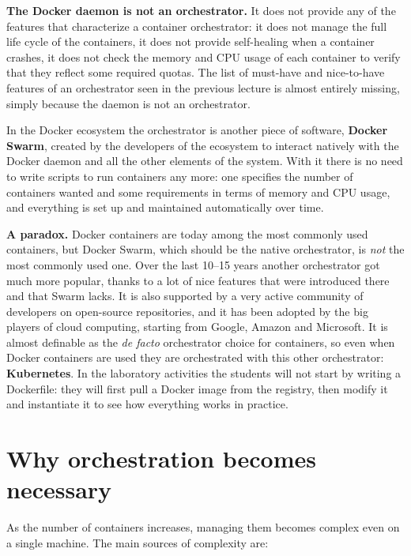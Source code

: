 \begin{notebox}
	\textbf{The Docker daemon is not an orchestrator.} It does not provide any of the features that characterize a container orchestrator: it does not manage the full life cycle of the containers, it does not provide self-healing when a container crashes, it does not check the memory and CPU usage of each container to verify that they reflect some required quotas. The list of must-have and nice-to-have features of an orchestrator seen in the previous lecture is almost entirely missing, simply because the daemon is not an orchestrator.

	\medskip
	In the Docker ecosystem the orchestrator is another piece of software, \textbf{Docker Swarm}, created by the developers of the ecosystem to interact natively with the Docker daemon and all the other elements of the system. With it there is no need to write scripts to run containers any more: one specifies the number of containers wanted and some requirements in terms of memory and CPU usage, and everything is set up and maintained automatically over time.
\end{notebox}

\begin{notebox}
	\textbf{A paradox.} Docker containers are today among the most commonly used containers, but Docker Swarm, which should be the native orchestrator, is \emph{not} the most commonly used one. Over the last 10--15 years another orchestrator got much more popular, thanks to a lot of nice features that were introduced there and that Swarm lacks. It is also supported by a very active community of developers on open-source repositories, and it has been adopted by the big players of cloud computing, starting from Google, Amazon and Microsoft. It is almost definable as the \emph{de facto} orchestrator choice for containers, so even when Docker containers are used they are orchestrated with this other orchestrator: \textbf{Kubernetes}. In the laboratory activities the students will not start by writing a Dockerfile: they will first pull a Docker image from the registry, then modify it and instantiate it to see how everything works in practice.
\end{notebox}

\section{Why orchestration becomes necessary}

As the number of containers increases, managing them becomes complex even on a single machine. The main sources of complexity are:

